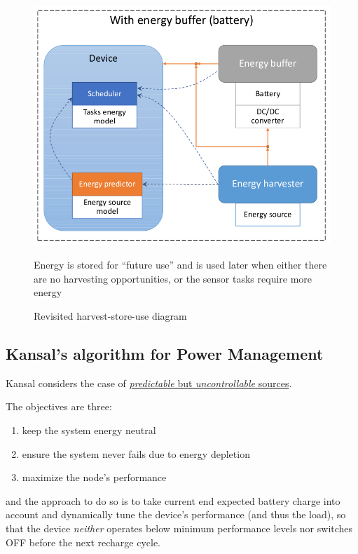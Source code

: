 \begin{figure}[htbp]
   \centering
   \includegraphics{images/harveststoreuse_revisited.png}
   \caption{Revisited harvest-store-use diagram}
   \label{fig:harveststoreuse_revisited}
   Energy is stored for ``future use'' and is used later when either there are no harvesting opportunities, or the sensor tasks require more energy
\end{figure}

\subsection{Kansal's algorithm for Power Management}
Kansal considers the case of \ul{\textit{predictable} but \textit{uncontrollable} sources}.

The objectives are three:
\begin{enumerate}
   \item keep the system energy neutral
   \item ensure the system never fails due to energy depletion
   \item maximize the node's performance
\end{enumerate}
and the approach to do so is to take current end expected battery charge into account and dynamically tune the device’s performance (and thus the load),
so that the device \textit{neither} operates below minimum performance levels nor switches OFF before the next recharge cycle.

